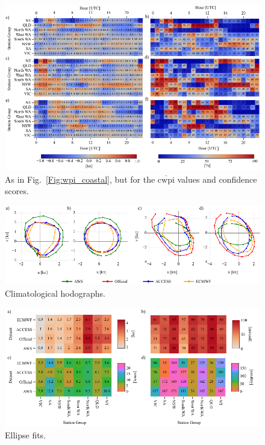 \documentclass[alpha-refs]{wiley-article}
\begin{document}
\begin{figure}
\centering
\includegraphics{cwpi_coastal.pdf}
\caption{As in Fig.~\ref{Fig:wpi_coastal}, but for the $\overline{\text{cwpi}}$ values and confidence scores.}
\label{Fig:cwpi_coastal}
\end{figure}

\begin{figure}
\centering
\includegraphics{clim_hodo.pdf}
\caption{Climatological hodographs.}
\label{Fig:clim_hodo}
\end{figure}

\begin{figure}
\centering
\includegraphics{ellipse_stats.pdf}
\caption{Ellipse fits.}
\label{Fig:ellipse_stats}
\end{figure}
\end{document}
